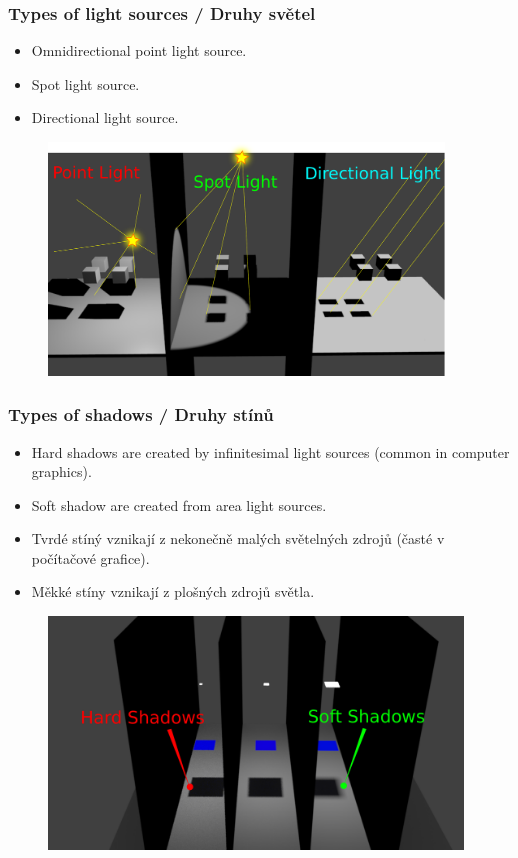 \begin{frame}\frametitle{Types of light sources / Druhy světel}
  \begin{itemize}
    \item Omnidirectional point light source.
    \item Spot light source.
    \item Directional light source.
  \end{itemize}
  \begin{figure}[h]
    \includegraphics[width=10.5cm,keepaspectratio]{pics/shadows/lightTypes/lightTypes.pdf}
  \end{figure}
\end{frame}

\begin{frame}\frametitle{Types of shadows / Druhy stínů}\scriptsize
  \begin{itemize}
    \item Hard shadows are created by infinitesimal light sources (common in computer graphics).
    \item Soft shadow are created from area light sources.
  \end{itemize}
  \begin{itemize}
    \item Tvrdé stíný vznikají z nekonečně malých světelných zdrojů (časté v počítačové grafice).
    \item Měkké stíny vznikají z plošných zdrojů světla.
  \end{itemize}
  \begin{figure}[h]
    \includegraphics[width=11cm,keepaspectratio]{pics/shadows/hardShadow/hardShadow.pdf}
  \end{figure}
\end{frame}

